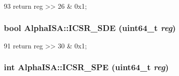 \begin{DoxyCode}
93 { return reg >> 26 & 0x1; }
\end{DoxyCode}
\hypertarget{namespaceAlphaISA_a77a0dc059f8e677358c55c3c206ea78b}{
\subsubsection[{ICSR\_\-SDE}]{\setlength{\rightskip}{0pt plus 5cm}bool AlphaISA::ICSR\_\-SDE (uint64\_\-t {\em reg})}}
\label{namespaceAlphaISA_a77a0dc059f8e677358c55c3c206ea78b}



\begin{DoxyCode}
91 { return reg >> 30 & 0x1; }
\end{DoxyCode}
\hypertarget{namespaceAlphaISA_a1296f5f4491f6eafcd4cac6c96b2ceb4}{
\subsubsection[{ICSR\_\-SPE}]{\setlength{\rightskip}{0pt plus 5cm}int AlphaISA::ICSR\_\-SPE (uint64\_\-t {\em reg})}}
\label{namespaceAlphaISA_a1296f5f4491f6eafcd4cac6c96b2ceb4}



